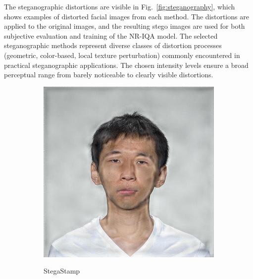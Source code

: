The steganographic distortions are visible in Fig.~\ref{fig:steganography}, which shows examples of distorted facial images from each method. The distortions are applied to the original images, and the resulting stego images are used for both subjective evaluation and training of the NR-IQA model. The selected steganographic methods represent diverse classes of distortion processes (geometric, color-based, local texture perturbation) commonly encountered in practical steganographic applications. The chosen intensity levels ensure a broad perceptual range from barely noticeable to clearly visible distortions.

\begin{figure}
    \centering
    \begin{subfigure}{0.23\textwidth}
        \centering
        \includegraphics[width=\textwidth]{images/005_StegaStamp_1.4.jpg}\\
        \caption{StegaStamp}\label{fig:steganography_a}
    \end{subfigure}
    \hfill
    \begin{subfigure}{0.23\textwidth}
        \centering

\end{subfigure}
\end{figure}
